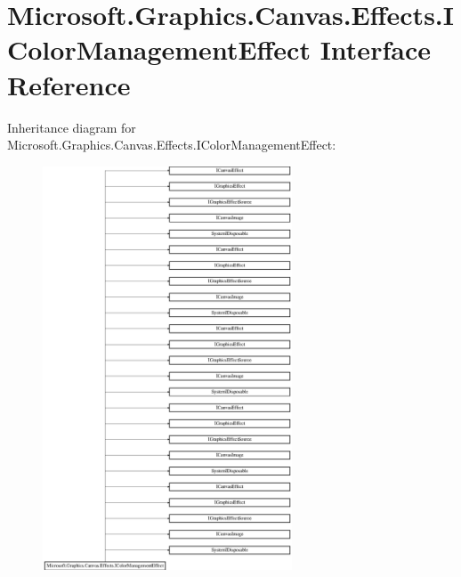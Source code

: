 \hypertarget{interface_microsoft_1_1_graphics_1_1_canvas_1_1_effects_1_1_i_color_management_effect}{}\section{Microsoft.\+Graphics.\+Canvas.\+Effects.\+I\+Color\+Management\+Effect Interface Reference}
\label{interface_microsoft_1_1_graphics_1_1_canvas_1_1_effects_1_1_i_color_management_effect}
Inheritance diagram for Microsoft.\+Graphics.\+Canvas.\+Effects.\+I\+Color\+Management\+Effect\+:\begin{figure}[H]
\begin{center}
\leavevmode
\includegraphics[height=12.000000cm]{interface_microsoft_1_1_graphics_1_1_canvas_1_1_effects_1_1_i_color_management_effect}
\end{center}
\end{figure}
